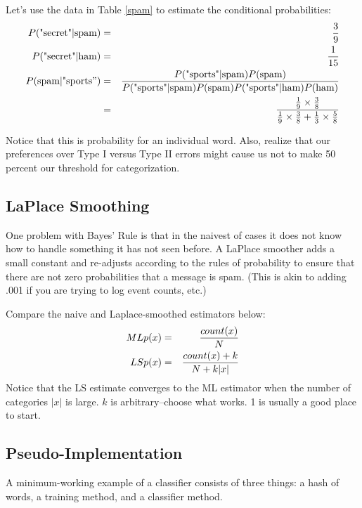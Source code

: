 \documentclass[12pt,letter]{article}
\begin{document}
Let's use the data in Table \ref{spam} to estimate the conditional probabilities:
\begin{eqnarray*}
P(\text{"secret"|spam}) &=& \frac{3}{9} \\
P(\text{"secret"|ham}) &=& \frac{1}{15} \\
P(\text{spam|"sports}") &=& {
  P(\text{"sports"|spam}) P(\text{spam}) \over
  {P(\text{"sports"}|\text{spam})P(\text{spam})P(\text{"sports"}|\text{ham})
    P(\text{ham})}} \\
&=& {\frac{1}{9} \times \frac{3}{8}} \over {\frac{1}{9} \times
  \frac{3}{8} + \frac{1}{3} \times
  \frac{5}{8}}
\end{eqnarray*}

Notice that this is probability for an individual word. Also, realize
that our preferences over Type I versus Type II errors might cause us
not to make 50 percent our threshold for categorization. 



\subsection{LaPlace Smoothing}
One problem with Bayes' Rule is that in the naivest of cases it does
not know how to handle something it has not seen before. A LaPlace
smoother adds a small constant and re-adjusts according to the rules
of probability to ensure that there are not zero probabilities that a
message is spam. (This is akin to adding .001 if you are trying to log
event counts, etc.)

Compare the naive and Laplace-smoothed estimators below:
\begin{eqnarray*}
ML p(x) &=& {count(x) \over N} \\
LS p(x) &=& {count(x) + k \over N + k|x|}
\end{eqnarray*}
Notice that the LS estimate converges to the ML estimator when the
number of categories $|x|$ is large. $k$ is arbitrary--choose what
works. 1 is usually a good place to start.


\subsection{Pseudo-Implementation}

A minimum-working example of a classifier consists of three things: a
hash of words, a training method, and a classifier method.
\end{document}
